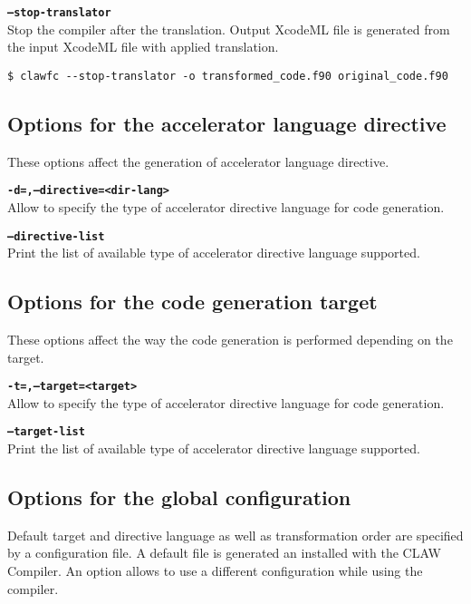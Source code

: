 \documentclass{article}
\begin{document}
\textbf{\texttt{--stop-translator}}\\
Stop the compiler after the translation. Output XcodeML file is generated from the input XcodeML file with applied translation.
\begin{lstlisting}
$ clawfc --stop-translator -o transformed_code.f90 original_code.f90
\end{lstlisting}

\subsection{Options for the accelerator language directive}
These options affect the generation of accelerator language directive.

\textbf{\texttt{-d=,--directive=<dir-lang>}}\\
Allow to specify the type of accelerator directive language for code generation.

\textbf{\texttt{--directive-list}}\\
Print the list of available type of accelerator directive language supported.

\subsection{Options for the code generation target}
These options affect the way the code generation is performed depending on the target.

\textbf{\texttt{-t=,--target=<target>}}\\
Allow to specify the type of accelerator directive language for code generation.

\textbf{\texttt{--target-list}}\\
Print the list of available type of accelerator directive language supported.

\subsection{Options for the global configuration}
Default target and directive language as well as transformation order are
specified by a configuration file.
A default file is generated an installed with the CLAW Compiler.
An option allows to use a different configuration while using the compiler.
\end{document}
